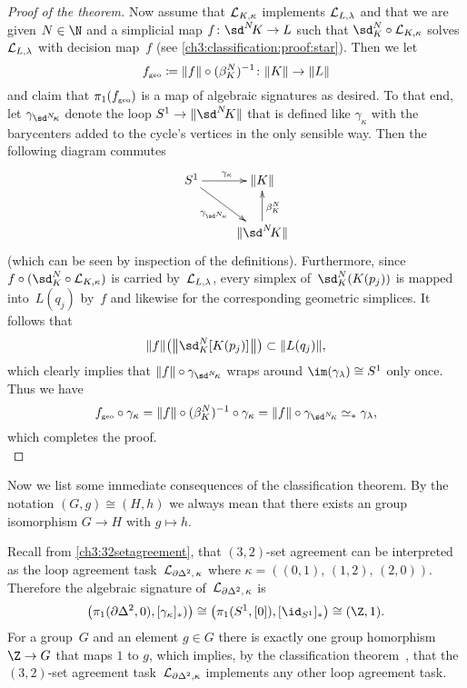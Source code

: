 \begin{proof}[Proof of the theorem]
    Now assume that $\mathcal{L}_{K,\kappa}$ implements $\mathcal{L}_{L,\lambda}$ and that we
    are given $N\in\N$ and a simplicial map $f\colon\sdNK\to L$ such that
    $\sd_K^N\after\Loop{K,\kappa}$ solves $\mathcal{L}_{L,\lambda}$ with decision
    map~$f$ (see \eqref{ch3:classification:proof:star}). Then we let
    \[ f_\geo \defeq \geom{f} \after (\beta_K^N)^{-1}
        \colon\geom K\to\geom L
    \]
    and claim that $\pi_1(f_{\scriptscriptstyle\mathrm{geo}})$ is a map of algebraic signatures as desired.
    To that end, let $\gamma_{\sdNkappa}$ denote the loop
    $S^1\to\geom{\sdNK}$ that is defined like $\gamma_\kappa$
     with the barycenters added to the cycle's
    vertices in the only sensible way. Then the following diagram commutes
    \[
        \xymatrix{
            S^1 \ar[r]^{\gamma_\kappa} \ar[dr]_{\gamma_{\sdNkappa}}
            & \geom{K}
            \\
            & \geom{\sdNK} \ar[u]_{\beta_K^N}
        }
    \]
    (which can be seen by inspection of the definitions).
    Furthermore, since $f\after(\sd_K^N\after\Loop{K,\kappa})$ is
    carried by~$\mathcal{L}_{L,\lambda}$, every simplex of~$\sd_K^N(K(p_j))$
    is mapped into~$L(q_j)$ by~$f$ and likewise for the corresponding
    geometric simplices. It follows that
    \[ \geom{f}\bigl(\geom[\big]{\sd_K^N[K(p_j)]\mkern1mu}\bigr)
        \subset \geom{L(q_j)}
    , \]
    which clearly implies that $\geom{f}\after\gamma_{\sdNkappa}$
    wraps around $\im(\gamma_\lambda)\cong S^1$ only once.
    Thus we have
    \[ f_\geo\after\gamma_\kappa 
        = \geom{f}\after(\beta_K^N)^{-1} \after\gamma_\kappa
        = \geom{f}\after\gamma_{\sdNkappa}
        \simeq_\ast \gamma_\lambda
    , \]
    which completes the proof.
    \\
\end{proof}

\pagebreak[2]
Now we list some immediate consequences of the classification theorem.
By the notation $(G,g) \cong (H,h)$ we always mean that there exists an group
isomorphism $G\to H$ with $g\mapsto h$.

\begin{thCorollary}
    \label{ch3:32setagreementisboss}
    Recall from \cref{ch3:32setagreement}, that $(3,2)$-set agreement can be
    interpreted as the loop agreement task~$\mathcal{L}_{\partial\Delta^2,\,\kappa}$
    where $\kappa = ((0,1),\,(1,2),\,(2,0))$. Therefore the algebraic signature
    of~$\mathcal{L}_{\partial\Delta^2,\,\kappa}$ is
    \[ \bigl( \pi_1(\partial\Delta^2,0), [\gamma_\kappa]_\ast) \bigr)
        \cong \bigl( \pi_1(S^1,[0]), [\id_{S^1}]_\ast \bigr)
        \cong (\Z,1)
    . \]
    For a group~$G$ and an element $g\in G$ there is exactly one group
    homorphism $\Z\to G$ that maps $1$ to $g$, which implies, by the
    classification theorem~, that the $(3,2)$-set
    agreement task~$\mathcal{L}_{\partial\Delta^2,\kappa}$ implements any other
    loop agreement task.
\end{thCorollary}

